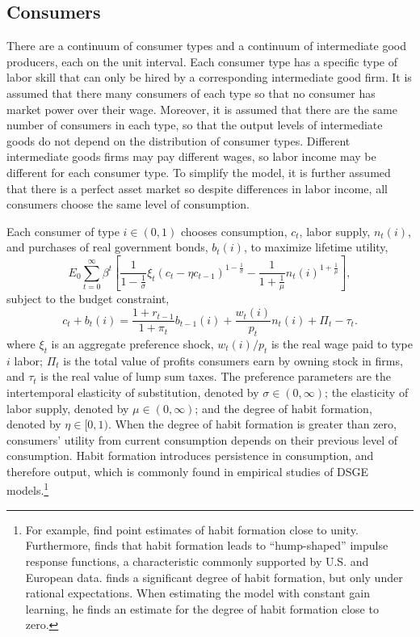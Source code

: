 \documentclass[10pt]{article}
\newcommand{\beq}{\begin{equation}}
\newcommand{\eeq}{\end{equation}}
\newcommand{\citee}[1]{\citet{#1}}
\begin{document}
\subsection{Consumers}
There are a continuum of consumer types and a continuum of intermediate good producers, each on the unit interval.  Each consumer type has a specific type of labor skill that can only be hired by a corresponding intermediate good firm.  It is assumed that there many consumers of each type so that no consumer has market power over their wage.  Moreover, it is assumed that there are the same number of consumers in each type, so that the output levels of intermediate goods do not depend on the distribution of consumer types.  Different intermediate goods firms may pay different wages, so labor income may be different for each consumer type.  To simplify the model, it is further assumed that there is a perfect asset market so despite differences in labor income, all consumers choose the same level of consumption.

Each consumer of type $i\in(0,1)$ chooses consumption, $c_t$, labor supply, $n_t(i)$, and purchases of real government bonds, $b_{t}(i)$, to maximize lifetime utility,
\beq \label{eq:util} E_0 \sum_{t=0}^{\infty} \beta^t \left[ \frac{1}{1-\frac{1}{\sigma}} \xi_t \left(c_t - \eta c_{t-1}\right)^{1-\frac{1}{\sigma}} - \frac{1}{1+\frac{1}{\mu}} n_t(i)^{1+\frac{1}{\mu}} \right], \eeq
subject to the budget constraint, 
\beq \label{eq:bc} c_t + b_t(i) = \frac{1+r_{t-1}}{1+\pi_t} b_{t-1}(i) + \frac{w_t(i)}{p_t} n_t(i) + \Pi_t - \tau_t. \eeq
where $\xi_t$ is an aggregate preference shock, $w_t(i)/p_t$ is the real wage paid to type $i$ labor; $\Pi_t$ is the total value of profits consumers earn by owning stock in firms, and $\tau_t$ is the real value of lump sum taxes.  The preference parameters are the intertemporal elasticity of substitution, denoted by $\sigma \in (0,\infty)$; the elasticity of labor supply, denoted by $\mu \in (0, \infty)$; and the degree of habit formation, denoted by $\eta \in [0,1)$.  When the degree of habit formation is greater than zero, consumers' utility from current consumption depends on their previous level of consumption.  Habit formation introduces persistence in consumption, and therefore output, which is commonly found in empirical studies of DSGE models.\footnote{For example, \citee{smetswouters2005} find point estimates of habit formation close to unity.  Furthermore, \citee{fuhrer2000} finds that habit formation leads to ``hump-shaped'' impulse response functions, a characteristic commonly supported by U.S. and European data.  \citee{milani2007} finds a significant degree of habit formation, but only under rational expectations.  When estimating the model with constant gain learning, he finds an estimate for the degree of habit formation close to zero.}   
\end{document}

